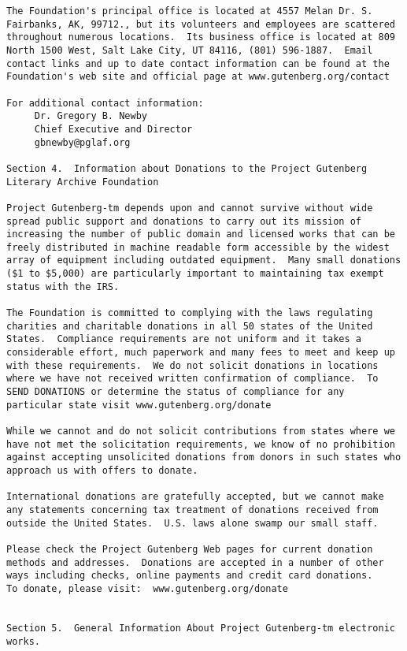 \documentclass[oneside]{book}
\begin{document}
\begin{verbatim}
The Foundation's principal office is located at 4557 Melan Dr. S.
Fairbanks, AK, 99712., but its volunteers and employees are scattered
throughout numerous locations.  Its business office is located at 809
North 1500 West, Salt Lake City, UT 84116, (801) 596-1887.  Email
contact links and up to date contact information can be found at the
Foundation's web site and official page at www.gutenberg.org/contact

For additional contact information:
     Dr. Gregory B. Newby
     Chief Executive and Director
     gbnewby@pglaf.org

Section 4.  Information about Donations to the Project Gutenberg
Literary Archive Foundation

Project Gutenberg-tm depends upon and cannot survive without wide
spread public support and donations to carry out its mission of
increasing the number of public domain and licensed works that can be
freely distributed in machine readable form accessible by the widest
array of equipment including outdated equipment.  Many small donations
($1 to $5,000) are particularly important to maintaining tax exempt
status with the IRS.

The Foundation is committed to complying with the laws regulating
charities and charitable donations in all 50 states of the United
States.  Compliance requirements are not uniform and it takes a
considerable effort, much paperwork and many fees to meet and keep up
with these requirements.  We do not solicit donations in locations
where we have not received written confirmation of compliance.  To
SEND DONATIONS or determine the status of compliance for any
particular state visit www.gutenberg.org/donate

While we cannot and do not solicit contributions from states where we
have not met the solicitation requirements, we know of no prohibition
against accepting unsolicited donations from donors in such states who
approach us with offers to donate.

International donations are gratefully accepted, but we cannot make
any statements concerning tax treatment of donations received from
outside the United States.  U.S. laws alone swamp our small staff.

Please check the Project Gutenberg Web pages for current donation
methods and addresses.  Donations are accepted in a number of other
ways including checks, online payments and credit card donations.
To donate, please visit:  www.gutenberg.org/donate


Section 5.  General Information About Project Gutenberg-tm electronic
works.


\end{verbatim}
\end{document}
